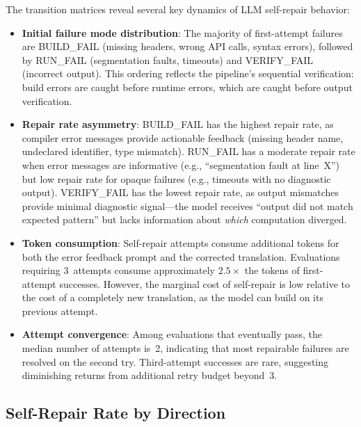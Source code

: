 The transition matrices reveal several key dynamics of LLM self-repair behavior:

\begin{itemize}
  \item \textbf{Initial failure mode distribution}: The majority of first-attempt
    failures are BUILD\_FAIL (missing headers, wrong API calls, syntax errors),
    followed by RUN\_FAIL (segmentation faults, timeouts) and VERIFY\_FAIL
    (incorrect output). This ordering reflects the pipeline's sequential
    verification: build errors are caught before runtime errors, which are caught
    before output verification.

  \item \textbf{Repair rate asymmetry}: BUILD\_FAIL has the highest repair rate,
    as compiler error messages provide actionable feedback (missing header name,
    undeclared identifier, type mismatch). RUN\_FAIL has a moderate repair rate
    when error messages are informative (e.g., ``segmentation fault at line~X'')
    but low repair rate for opaque failures (e.g., timeouts with no diagnostic
    output). VERIFY\_FAIL has the lowest repair rate, as output mismatches
    provide minimal diagnostic signal---the model receives ``output did not
    match expected pattern'' but lacks information about \emph{which} computation
    diverged.

  \item \textbf{Token consumption}: Self-repair attempts consume additional
    tokens for both the error feedback prompt and the corrected translation.
    Evaluations requiring 3~attempts consume approximately $2.5{\times}$ the
    tokens of first-attempt successes. However, the marginal cost of self-repair
    is low relative to the cost of a completely new translation, as the model can
    build on its previous attempt.

  \item \textbf{Attempt convergence}: Among evaluations that eventually pass,
    the median number of attempts is~2, indicating that most repairable failures
    are resolved on the second try. Third-attempt successes are rare, suggesting
    diminishing returns from additional retry budget beyond~3.
\end{itemize}

\subsection{Self-Repair Rate by Direction}
\label{sec:appendix-c2}

